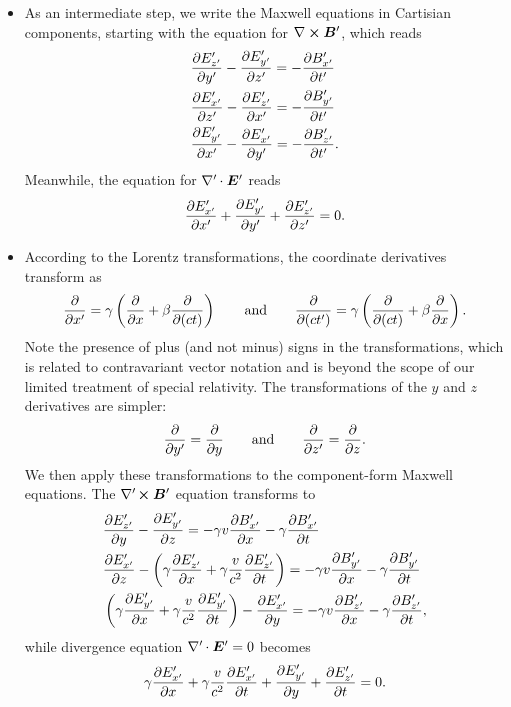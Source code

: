 \documentclass[11pt, a4paper]{article}
\newcommand{\eqtext}[1]{\qquad \text{#1} \qquad}
\renewcommand{\vec}[1]{\bm{#1}} %
\newcommand{\E}{\vec{E}} %
\newcommand{\B}{\vec{B}} %
\renewcommand{\curl}{\nabla \cross}
\newcommand{\divp}{\nabla' \mspace{-1mu} \cdot}  %
\newcommand{\curlp}{\nabla' \mspace{-2mu} \cross}
\begin{document}
\begin{itemize}
    \item As an intermediate step, we write the Maxwell equations in Cartisian components, starting with the equation for $ \curl \B' $, which reads
	\begin{align*}
		& \pdv{E'_{z'}}{y'} - \pdv{E'_{y'}}{z'} = - \pdv{B'_{x'}}{t'} \\ 
		&\pdv{E'_{x'}}{z'} - \pdv{E'_{z'}}{x'} = - \pdv{B'_{y'}}{t'}\\
		&\pdv{E'_{y'}}{x'} - \pdv{E'_{x'}}{y'} = - \pdv{B'_{z'}}{t'}.
	\end{align*}
    Meanwhile, the equation for $ \divp \E' $ reads
	\begin{equation*}
		\pdv{E'_{x'}}{x'} + 	\pdv{E'_{y'}}{y'} + 	\pdv{E'_{z'}}{z'} = 0.
	\end{equation*}
    
    \item According to the Lorentz transformations, the coordinate derivatives transform as
	\begin{equation*}
		\pdv{x'}  = \gamma \left(\pdv{x} + \beta \pdv{(ct)}\right) \eqtext{and} \pdv{(ct')} = \gamma \left(\pdv{(ct)} + \beta \pdv{x}\right).
	\end{equation*}
    Note the presence of plus (and not minus) signs in the transformations, which is related to contravariant vector notation and is beyond the scope of our limited treatment of special relativity. The transformations of the $ y $ and $ z $ derivatives are simpler:
	\begin{equation*}
		\pdv{y'} = \pdv{y} \eqtext{and} \pdv{z'} = \pdv{z}.
	\end{equation*}
    We then apply these transformations to the component-form Maxwell equations. The $ \curlp \B' $ equation transforms to
	\begin{align*}
		& \pdv{E'_{z'}}{y} - \pdv{E'_{y'}}{z} = - \gamma v \pdv{B'_{x'}}{x} - \gamma \pdv{B'_{x'}}{t}\\
		& \pdv{E'_{x'}}{z} - \left(\gamma \pdv{E'_{z'}}{x} + \gamma \frac{v}{c^{2}} \pdv{E'_{z'}}{t}\right) = - \gamma v \pdv{B'_{y'}}{x} - \gamma \pdv{B'_{y'}}{t}\\
		& \left(\gamma \pdv{E'_{y'}}{x} + \gamma \frac{v}{c^{2}}\pdv{E'_{y'}}{t}\right) - \pdv{E'_{x'}}{y} = - \gamma v \pdv{B'_{z'}}{x} - \gamma \pdv{B'_{z'}}{t},
	\end{align*}
	while divergence equation $ \divp \E' = 0$ becomes
	\begin{equation*}
		\gamma \pdv{E'_{x'}}{x} + \gamma \frac{v}{c^{2}} \pdv{E'_{x'}}{t} + \pdv{E'_{y'}}{y} + \pdv{E'_{z'}}{t} = 0.
	\end{equation*}
    

\end{itemize}
\end{document}
